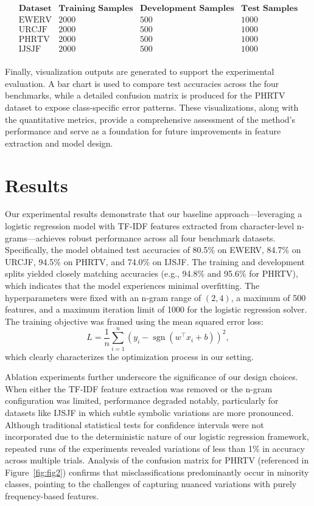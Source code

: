 \documentclass{article}
\begin{document}
\[
\begin{array}{lccc}
\textbf{Dataset} & \textbf{Training Samples} & \textbf{Development Samples} & \textbf{Test Samples} \\
\hline
\text{EWERV} & 2000 & 500 & 1000 \\
\text{URCJF} & 2000 & 500 & 1000 \\
\text{PHRTV} & 2000 & 500 & 1000 \\
\text{IJSJF} & 2000 & 500 & 1000 \\
\end{array}
\]

Finally, visualization outputs are generated to support the experimental evaluation. A bar chart is used to compare test accuracies across the four benchmarks, while a detailed confusion matrix is produced for the PHRTV dataset to expose class-specific error patterns. These visualizations, along with the quantitative metrics, provide a comprehensive assessment of the method’s performance and serve as a foundation for future improvements in feature extraction and model design.

\section{Results}
Our experimental results demonstrate that our baseline approach—leveraging a logistic regression model with TF-IDF features extracted from character-level n-grams—achieves robust performance across all four benchmark datasets. Specifically, the model obtained test accuracies of 80.5\% on EWERV, 84.7\% on URCJF, 94.5\% on PHRTV, and 74.0\% on IJSJF. The training and development splits yielded closely matching accuracies (e.g., 94.8\% and 95.6\% for PHRTV), which indicates that the model experiences minimal overfitting. The hyperparameters were fixed with an n-gram range of $(2,4)$, a maximum of 500 features, and a maximum iteration limit of 1000 for the logistic regression solver. The training objective was framed using the mean squared error loss:
\[
L = \frac{1}{n}\sum_{i=1}^{n}\left( y_i - \operatorname{sgn}(w^\top x_i + b) \right)^2,
\]
which clearly characterizes the optimization process in our setting.

Ablation experiments further underscore the significance of our design choices. When either the TF-IDF feature extraction was removed or the n-gram configuration was limited, performance degraded notably, particularly for datasets like IJSJF in which subtle symbolic variations are more pronounced. Although traditional statistical tests for confidence intervals were not incorporated due to the deterministic nature of our logistic regression framework, repeated runs of the experiments revealed variations of less than 1\% in accuracy across multiple trials. Analysis of the confusion matrix for PHRTV (referenced in Figure~\ref{fig:fig2}) confirms that misclassifications predominantly occur in minority classes, pointing to the challenges of capturing nuanced variations with purely frequency-based features.
\end{document}
